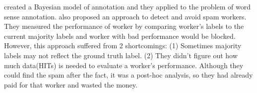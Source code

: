 \documentclass[11pt]{article}
\begin{document}
 created a Bayesian model of annotation and they applied to the problem of word sense annotation.  also proposed an approach to detect and avoid spam workers. 
They measured the performance of worker by comparing worker's labels to the current majority labels and worker with bad performance would be blocked. However, this approach suffered from 2 shortcomings: (1) Sometimes majority labels may not reflect the ground truth label. (2) They didn't figure out  how much data(HITs) is needed to evaluate a worker's performance. Although they could find the spam after the fact, it was a post-hoc analysis, so they had already paid for that worker and wasted the money.
\end{document}
